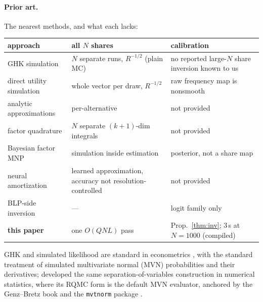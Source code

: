 \documentclass[12pt]{article}
\theoremstyle{remark}
\begin{document}
\paragraph{Prior art.} The nearest methods, and what each lacks:
\nopagebreak[4]

\begin{center}
\footnotesize
\setlength{\tabcolsep}{5pt}
\renewcommand{\arraystretch}{1.25}
\begin{tabular}{|p{4.1cm}|p{4.1cm}|p{4.5cm}|}
\hline
\textbf{approach} & \textbf{all $N$ shares} & \textbf{calibration} \\
\hline
GHK simulation \citep{geweke1994,hajivassiliou1998} & $N$ separate runs, $R^{-1/2}$ (plain MC) & no reported large-$N$ share inversion known to us \\
\hline
direct utility simulation & whole vector per draw, $R^{-1/2}$ & raw frequency map is nonsmooth \\
\hline
analytic approximations \citep{bhat2011,connors2014} & per-alternative & not provided \\
\hline
factor quadrature \citep{butler1982,elrod1995} & $N$ separate $(k{+}1)$-dim integrals & not provided \\
\hline
Bayesian factor MNP \citep{loaiza2022} & simulation inside estimation & posterior, not a share map \\
\hline
neural amortization \citep{huch2026} & learned approximation, accuracy not resolution-controlled & not provided \\
\hline
BLP-side inversion \citep{berry1995,conlon2020} & --- & logit family only \\
\hline
\textbf{this paper} & one $O(QNL)$ pass & Prop.~\ref{thm:inv}; 3\,s at $N{=}1000$ (compiled) \\
\hline
\end{tabular}
\end{center}



GHK and simulated likelihood are standard in econometrics
\citep{geweke1994,hajivassiliou1998,train2009}, with
\citet{hmr1996} the standard treatment of simulated multivariate
normal (MVN) probabilities
and their derivatives; \citet{genz1992}
developed the same separation-of-variables construction in numerical
statistics, where its RQMC form is the default MVN evaluator, anchored
by the Genz--Bretz book \citep{genzbretz2009} and the \texttt{mvtnorm}
package \citep{mi2009}.
\end{document}

